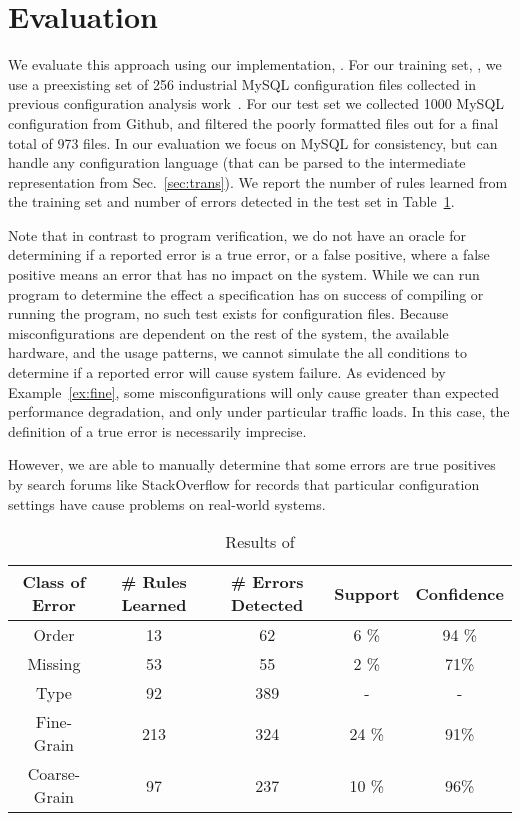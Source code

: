
\section{Evaluation}

We evaluate this approach using our implementation, \app.
For our training set, \trainingSet, we use a preexisting set of 256 industrial MySQL configuration files collected in previous configuration analysis work~\cite{xu15systems}.
For our test set we collected 1000 MySQL configuration from Github, and filtered the poorly formatted files out for a final total of 973 files.
In our evaluation we focus on MySQL for consistency, but \app can handle any configuration language (that can be parsed to the intermediate representation from Sec.~\ref{sec:trans}).
We report the number of rules learned from the training set and number of errors detected in the test set in Table~\ref{table:learning}.

Note that in contrast to program verification, we do not have an oracle for determining if a reported error is a true error, or a false positive, where a false positive means an error that has no impact on the system.
While we can run program to determine the effect a specification has on success of compiling or running the program, no such test exists for configuration files.
Because misconfigurations are dependent on the rest of the system, the available hardware, and the usage patterns, we cannot simulate the all conditions to determine if a reported error will cause system failure.
As evidenced by Example~\ref{ex:fine}, some misconfigurations will only cause greater than expected performance degradation, and only under particular traffic loads.
In this case, the definition of a true error is necessarily imprecise.

However, we are able to manually determine that some errors are true positives by search forums like StackOverflow for records that particular configuration settings have cause problems on real-world systems.


\begin{table}[h]
\centering
\caption{Results of \app}
\label{table:learning}
\setlength{\tabcolsep}{0.5em}
\begin{tabular}{|c|c|c|c|c|}
\hline
{\bf Class of Error } & {\bf \# Rules Learned} & {\bf \# Errors Detected} & {\bf Support} & {\bf Confidence}\\ 
\hline
\hline
Order        & 13  & 62   & 6 \% & 94 \% \\ 
Missing      & 53  & 55   & 2 \%  & 71\% \\ 
Type         & 92  & 389  & -  & -  \\ 
Fine-Grain   & 213 & 324  & 24 \% & 91\%  \\ 
Coarse-Grain & 97  & 237  & 10 \% & 96\% \\ 
\hline 
\end{tabular}
\end{table}

